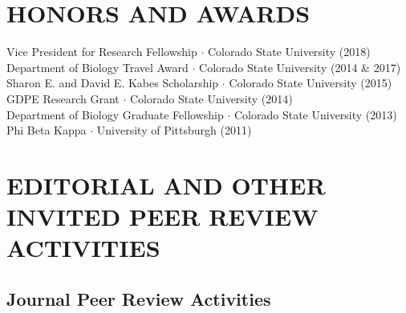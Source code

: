 \documentclass{cv}
\begin{document}


\section*{HONORS AND AWARDS}



Vice President for Research Fellowship $\cdot$ Colorado State University (2018) \\ %
Department of Biology Travel Award $\cdot$ Colorado State University (2014 \& 2017) \\ %
Sharon E. and David E. Kabes Scholarship $\cdot$ Colorado State University (2015) \\ %
GDPE Research Grant $\cdot$ Colorado State University (2014) \\ %
Department of Biology Graduate Fellowship $\cdot$ Colorado State University (2013) \\ %
Phi Beta Kappa $\cdot$ University of Pittsburgh (2011)



\section*{EDITORIAL AND OTHER INVITED PEER REVIEW ACTIVITIES}

\subsection*{Journal Peer Review Activities}
\end{document}

